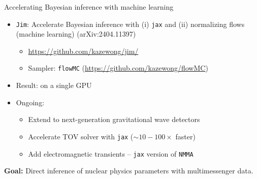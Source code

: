 \documentclass[usenames,dvipsnames,t]{beamer}
\begin{document}
\begin{frame}{Accelerating Bayesian inference with machine learning}

  \def\x{4mm}
  \def\y{2mm}

  \begin{itemize}
    \item \texttt{Jim}: Accelerate Bayesian inference with (i) \texttt{jax} and (ii) normalizing flows (machine learning) (arXiv:2404.11397)
    \begin{itemize}
      \item \url{https://github.com/kazewong/jim/}
      
      \item Sampler: \texttt{flowMC} (\url{https://github.com/kazewong/flowMC})
    \end{itemize}
    
    \vspace{\x}

    \item Result:  on a single GPU
    


    \vspace{\x}

    \item Ongoing: 
    \vspace{\y}
    \begin{itemize}
      \item Extend to next-generation gravitational wave detectors
      
      \vspace{\y}

      \item Accelerate TOV solver with \texttt{jax} ($\sim 10 - 100 \times$ faster)
      
      \vspace{\y}

      \item Add electromagnetic transients -- \texttt{jax} version of \texttt{NMMA}
    \end{itemize}
  \end{itemize}

  \begin{tcolorbox}[colback=blue!10, boxrule=0pt]
    \textbf{Goal:} Direct inference of nuclear physics parameters with multimessenger data.
  \end{tcolorbox}


\end{frame}
\end{document}
